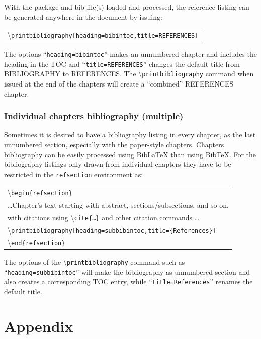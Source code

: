 \documentclass{article}
\newcommand\cmd[1]{\textbackslash\texttt{#1}}
\newcommand\ix[1]{#1\index{#1}} %
\newcommand\ixm[2]{#2\index{#1!#2}} %
\newcommand\ccmd[1]{ %
\begin{center}
\begin{tabular}{l}
#1
\end{tabular}
\end{center}
}
\begin{document}
With the package and bib file(s) loaded and processed, the reference listing can be generated anywhere in the document by issuing:
\ccmd{
\cmd{\ixm{Bib\LaTeX\ }{printbibliography}[heading=bibintoc,title=REFERENCES]}
}

The options ``\texttt{heading=bibintoc}'' makes an unnumbered chapter and includes the heading in the TOC and ``\texttt{title=REFERENCES}'' changes the default title from BIBLIOGRAPHY to REFERENCES. The \cmd{printbibliography} command when issued at the end of the chapters will create a ``combined'' REFERENCES chapter. 

\subsubsection{Individual chapters bibliography (multiple)}
Sometimes it is desired to have a bibliography listing in every chapter, as the last unnumbered section, especially with the paper-style chapters. Chapters bibliography can be easily processed using Bib\LaTeX\/ than using \ix{BibTeX}. For the bibliography listings only drawn from individual chapters they have to be restricted in the \texttt{refsection} environment as:
\ccmd{
\cmd{begin\{\ix{refsection}\}}\\[1ex]
\hspace{0.2in}\ldots Chapter's text starting with abstract, sections/subsections, and so on, \\
\hspace{0.2in}with citations using \cmd{cite\{\ldots\}} and other citation commands \ldots \\[1ex]
\cmd{printbibliography[heading=subbibintoc,title=\{References\}]}\\
\cmd{end\{refsection\}}
}

The options of the \cmd{printbibliography} command such as ``\texttt{heading=subbibintoc}'' will make the bibliography as unnumbered section and also creates a corresponding TOC entry, while ``\texttt{title=References}'' renames the default title. 

\section{Appendix}

\end{document}
